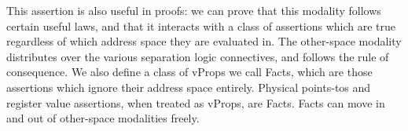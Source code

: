 \documentclass[acmsmall,screen,nonacm]{acmart}
\begin{document}
This assertion is also useful in proofs: we can prove that this modality follows certain useful laws, and that it interacts with
a class of assertions which are true regardless of which address space they are evaluated in.
The other-space modality distributes over the various separation logic connectives, and follows the rule of
consequence.
We also define a class of \textsf{vProp}s we call \textsf{Fact}s, which are those assertions
which ignore their address space entirely.
Physical points-tos and register value assertions, when treated as \textsf{vProp}s, are \textsf{Fact}s.
\textsf{Fact}s can move in and out of other-space modalities freely.



  
%
%
%
%
%

%
%
%
%
%

%
%
%

%

%

%
%
%
%
%
%
\end{document}
